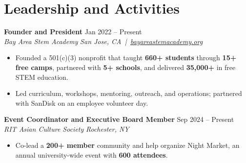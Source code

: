 \documentclass[10pt,letterpaper]{article}
\newif\ifresumeFirstRole
\newcommand{\resumeRole}[4]{%
  \ifresumeFirstRole
    \global\resumeFirstRolefalse
  \else
    \vspace{0pt plus 1fill}%
  \fi
  \textbf{#1} \hfill #2\\
  \textit{#3} \hfill \textit{#4}
}
\begin{document}
\section*{Leadership and Activities}
\resumeRole{Founder and President}{Jan 2022 -- Present}{Bay Area Stem Academy}{San Jose, CA \,|\, \href{https://bayareastemacademy.org}{bayareastemacademy.org}}
\begin{itemize}
  \item Founded a 501(c)(3) nonprofit that taught \textbf{660+ students} through \textbf{15+ free camps}, partnered with \textbf{5+ schools}, and delivered \textbf{\textdollar{}35,000+} in free STEM education.
  \item Led curriculum, workshops, mentoring, outreach, and operations; partnered with SanDisk on an employee volunteer day.
\end{itemize}

\resumeRole{Event Coordinator and Executive Board Member}{Sep 2024 -- Present}{RIT Asian Culture Society}{Rochester, NY}
\begin{itemize}
  \item Co-lead a \textbf{200+ member} community and help organize Night Market, an annual university-wide event with \textbf{600 attendees}.
\end{itemize}
\end{document}
